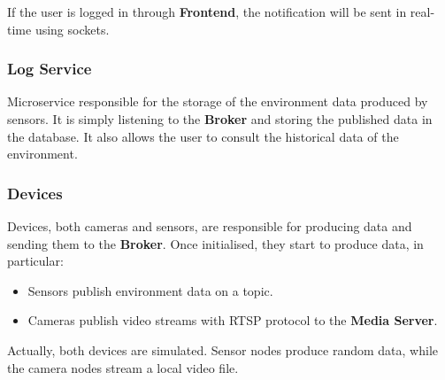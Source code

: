 \documentclass{scrartcl}
\begin{document}
    If the user is logged in through \textbf{Frontend}, the notification will be sent in real-time using sockets.

    \subsubsection{Log Service}
    Microservice responsible for the storage of the environment data produced by sensors.
    It is simply listening to the \textbf{Broker} and storing the published data in the database.
    It also allows the user to consult the historical data of the environment.

    \subsubsection{Devices}

    Devices, both cameras and sensors, are responsible for producing data and sending them to the \textbf{Broker}.
    Once initialised, they start to produce data, in particular:
    \begin{itemize}
        \item Sensors publish environment data on a topic.
        \item Cameras publish video streams with RTSP protocol to the \textbf{Media Server}.
    \end{itemize}

    Actually, both devices are simulated.
    Sensor nodes produce random data, while the camera nodes stream a local video file.
\end{document}

